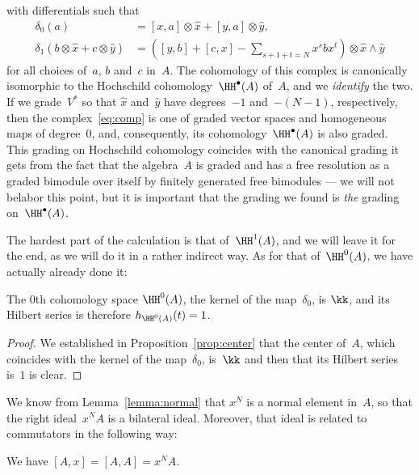 with differentials such that
  \begin{align}
  \delta_0(a) &= [x,a]\otimes\hat x+[y,a]\otimes\hat y, \\
  \delta_1(b\otimes\hat x+c\otimes\hat y) &=
    \left([y,b] + [c,x] - \sum_{s+1+t=N}x^sbx^t\right)
    \otimes\hat x\wedge\hat y
  \end{align}
for all choices of~$a$, $b$ and~$c$ in~$A$. The cohomology of this complex
is canonically isomorphic to the Hochschild cohomology~$\HH^\bullet(A)$
of~$A$, and we \emph{identify} the two. If we grade~$V^*$ so that $\hat x$
and~$\hat y$ have degrees~$-1$ and~$-(N-1)$, respectively, then the
complex~\eqref{eq:comp} is one of graded vector spaces and homogeneous maps
of degree~$0$, and, consequently, its cohomology~$\HH^\bullet(A)$ is also
graded. This grading on Hochschild cohomology coincides with the canonical
grading it gets from the fact that the algebra~$A$ is graded and has a free
resolution as a graded bimodule over itself by finitely generated free
bimodules --- we will not belabor this point, but it is important that the
grading we found is \emph{the} grading on~$\HH^\bullet(A)$.

\bigskip

The hardest part of the calculation is that of~$\HH^1(A)$, and we will
leave it for the end, as we will do it in a rather indirect way. As for
that of~$\HH^0(A)$, we have actually already done it:

\begin{Lemma}
The $0$th cohomology space $\HH^0(A)$, the kernel of the map~$\delta_0$, is
$\kk$, and its Hilbert series is therefore $h_{\HH^0(A)}(t) = 1$.
\end{Lemma}

\begin{proof}
We established in Proposition~\ref{prop:center} that the center of~$A$,
which coincides with the kernel of the map~$\delta_0$, is~$\kk$ and then
that its Hilbert series is~$1$ is clear. 
\end{proof}

We know from Lemma~\ref{lemma:normal} that $x^N$ is a normal element
in~$A$, so that the right ideal~$x^NA$ is a bilateral ideal. Moreover, that
ideal is related to commutators in the following way:

\begin{Lemma}\label{lemma:xN}
We have $[A,x]=[A,A]=x^NA$.
\end{Lemma}

